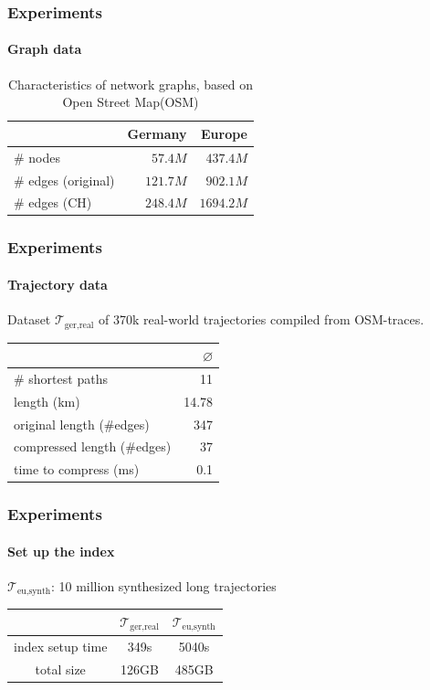 \documentclass[10pt, t,
aspectratio=1610,%
usenames,
dvipsnames,
]{beamer}
\newcommand{\traj}[2]{\mathcal{T}_{\text{#1},\text{#2}}}
\begin{document}
\begin{frame}
	\frametitle{Experiments}
	\framesubtitle{Graph data}
	\begin{table}
		{
			\caption{Characteristics of network graphs, based on Open Street Map(OSM)}
			\begin{tabular}{|l|rr|}
				\hline
				                    & Germany  & Europe
				\\ \hline
				\# nodes            & $57.4M$  & $437.4M$  \\
				\# edges (original) & $121.7M$ & $902.1M$  \\
				\# edges (CH)       & $248.4M$ & $1694.2M$ \\
				\hline
			\end{tabular}
		}
	\end{table}
\end{frame}

\begin{frame}
	\frametitle{Experiments}
	\framesubtitle{Trajectory data}
	Dataset $\traj{ger}{real}$ of 370k real-world trajectories compiled from OSM-traces.
	\begin{table}
		{
			\begin{tabular}{|l|r|}
				\hline
				                            & $\varnothing$ \\
				\hline
				\# shortest paths           & 11            \\
				length (km)                 & 14.78         \\
				original length (\#edges)   & 347           \\
				compressed length (\#edges) & 37            \\
				time to compress (ms)       & 0.1           \\
				\hline
			\end{tabular}
		}
	\end{table}
\end{frame}

\begin{frame}
	\frametitle{Experiments}
	\framesubtitle{Set up the index}
	\begin{table}
		{
			$\traj{eu}{synth}$: 10 million synthesized long trajectories \pause

			\centering
			\begin{tabular}{|c|cc|}
				\hline
				                 & $\traj{ger}{real}$ & $\traj{eu}{synth}$ \\
				\hline
				index setup time & 349s               & 5040s              \\
				total size       & 126GB              & 485GB              \\
				\hline
			\end{tabular}
		}
	\end{table}
\end{frame}
\end{document}
